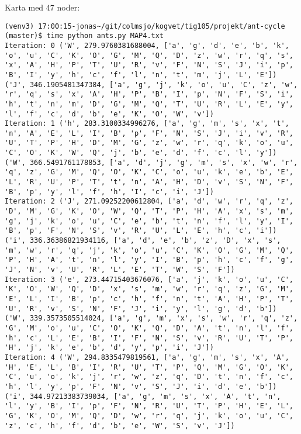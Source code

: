\documentclass[english,man]{apa6}
\begin{document}
Karta med 47 noder:

\begin{verbatim}
(venv3) 17:00:15-jonas~/git/colmsjo/kogvet/tig105/projekt/ant-cycle (master)$ time python ants.py MAP4.txt
Iteration: 0 ('W', 279.9760381688004, ['a', 'g', 'd', 'e', 'b', 'k', 'o', 'u', 'C', 'K', 'O', 'G', 'M', 'Q', 'D', 'z', 'w', 'r', 'q', 's', 'x', 'A', 'H', 'P', 'T', 'U', 'R', 'v', 'F', 'N', 'S', 'J', 'i', 'p', 'B', 'I', 'y', 'h', 'c', 'f', 'l', 'n', 't', 'm', 'j', 'L', 'E']) ('J', 346.1905481347384, ['a', 'g', 'j', 'k', 'o', 'u', 'C', 'z', 'w', 'r', 'q', 's', 'x', 'A', 'H', 'P', 'B', 'I', 'p', 'N', 'F', 'S', 'i', 'h', 't', 'n', 'm', 'D', 'G', 'M', 'Q', 'T', 'U', 'R', 'L', 'E', 'y', 'l', 'f', 'c', 'd', 'b', 'e', 'K', 'O', 'W', 'v'])
Iteration: 1 ('h', 283.3100334996276, ['a', 'g', 'm', 's', 'x', 't', 'n', 'A', 'E', 'L', 'I', 'B', 'p', 'F', 'N', 'S', 'J', 'i', 'v', 'R', 'U', 'T', 'P', 'H', 'D', 'M', 'G', 'z', 'w', 'r', 'q', 'k', 'o', 'u', 'C', 'O', 'K', 'W', 'Q', 'j', 'b', 'e', 'd', 'f', 'c', 'l', 'y']) ('W', 366.5491761178853, ['a', 'd', 'j', 'g', 'm', 's', 'x', 'w', 'r', 'q', 'z', 'G', 'M', 'Q', 'O', 'K', 'C', 'o', 'u', 'k', 'e', 'b', 'E', 'L', 'R', 'U', 'P', 'T', 't', 'n', 'A', 'H', 'D', 'v', 'S', 'N', 'F', 'B', 'p', 'y', 'l', 'f', 'h', 'I', 'c', 'i', 'J'])
Iteration: 2 ('J', 271.09252200612804, ['a', 'd', 'w', 'r', 'q', 'z', 'D', 'M', 'G', 'K', 'O', 'W', 'Q', 'T', 'P', 'H', 'A', 'x', 's', 'm', 'g', 'j', 'k', 'o', 'u', 'C', 'e', 'b', 't', 'n', 'f', 'l', 'y', 'I', 'B', 'p', 'F', 'N', 'S', 'v', 'R', 'U', 'L', 'E', 'h', 'c', 'i']) ('i', 336.36386821934116, ['a', 'd', 'e', 'b', 'z', 'D', 'x', 's', 'm', 'w', 'r', 'q', 'j', 'k', 'o', 'u', 'C', 'K', 'O', 'G', 'M', 'Q', 'P', 'H', 'A', 't', 'n', 'l', 'y', 'I', 'B', 'p', 'h', 'c', 'f', 'g', 'J', 'N', 'v', 'U', 'R', 'L', 'E', 'T', 'W', 'S', 'F'])
Iteration: 3 ('e', 273.44715403676076, ['a', 'j', 'k', 'o', 'u', 'C', 'K', 'O', 'W', 'Q', 'D', 'x', 's', 'm', 'w', 'r', 'q', 'z', 'G', 'M', 'E', 'L', 'I', 'B', 'p', 'c', 'h', 'f', 'n', 't', 'A', 'H', 'P', 'T', 'U', 'R', 'v', 'S', 'N', 'F', 'J', 'i', 'y', 'l', 'g', 'd', 'b']) ('W', 339.3573505514024, ['a', 'g', 'm', 'x', 's', 'w', 'r', 'q', 'z', 'G', 'M', 'o', 'u', 'C', 'O', 'K', 'Q', 'D', 'A', 't', 'n', 'l', 'f', 'h', 'c', 'L', 'E', 'B', 'I', 'F', 'N', 'S', 'v', 'R', 'U', 'T', 'P', 'H', 'j', 'k', 'e', 'b', 'd', 'y', 'p', 'i', 'J'])
Iteration: 4 ('W', 294.8335479819561, ['a', 'g', 'm', 's', 'x', 'A', 'H', 'E', 'L', 'B', 'I', 'R', 'U', 'T', 'P', 'Q', 'M', 'G', 'O', 'K', 'C', 'u', 'o', 'k', 'j', 'r', 'w', 'z', 'q', 'D', 't', 'n', 'f', 'c', 'h', 'l', 'y', 'p', 'F', 'N', 'v', 'S', 'J', 'i', 'd', 'e', 'b']) ('i', 344.97213383739034, ['a', 'g', 'm', 's', 'x', 'A', 't', 'n', 'l', 'y', 'B', 'I', 'p', 'F', 'N', 'R', 'U', 'T', 'P', 'H', 'E', 'L', 'G', 'K', 'O', 'M', 'Q', 'D', 'w', 'r', 'q', 'j', 'k', 'o', 'u', 'C', 'z', 'c', 'h', 'f', 'd', 'b', 'e', 'W', 'S', 'v', 'J'])

\end{verbatim}
\end{document}

